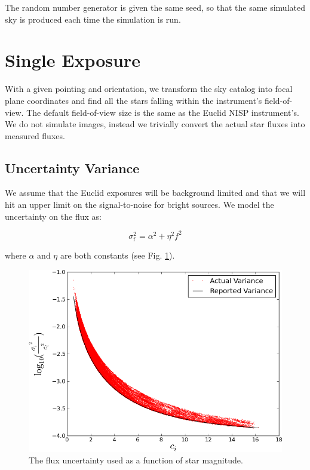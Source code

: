 \documentclass[12pt,a4paper,twoside]{article}
\begin{document}
The random number generator is given the same seed, so that the same simulated sky is produced each time the simulation is run.

\section{Single Exposure}
With a given pointing and orientation, we transform the sky catalog into focal plane coordinates and find all the stars falling within the instrument's field-of-view. The default field-of-view size is the same as the Euclid NISP instrument's. We do not simulate images, instead we trivially convert the actual star fluxes into measured fluxes. 

\subsection{Uncertainty Variance}
We assume that the Euclid exposures will be background limited and that we will hit an upper limit on the signal-to-noise for bright sources. We model the uncertainty on the flux as:

\begin{equation}
\sigma_{\text{f}}^{2} = \alpha^{2} + \eta^{2} f^{2} 
\end{equation}

\noindent{}where $\alpha$ and $\eta$ are both constants (see Fig. \ref{fig:flux_uncertainty}).

\begin{figure}[ht]
\begin{center}
\includegraphics[width=\textwidth]{invvar_plot.png}
\end{center}
\caption{The flux uncertainty used as a function of star magnitude.\label{fig:flux_uncertainty}}
\end{figure}
\end{document}
